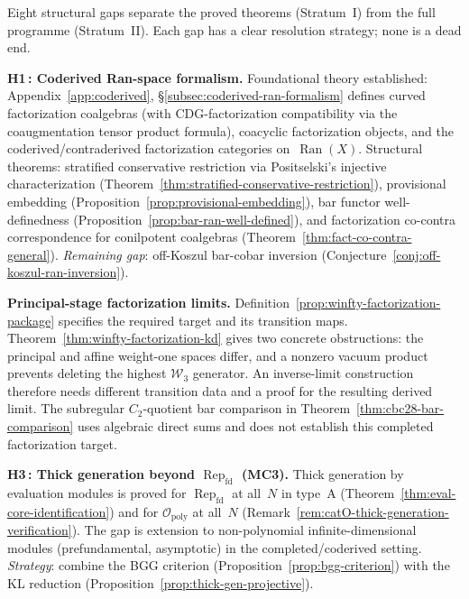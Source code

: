 \begin{remark}\label{rem:structural-gaps}
Eight structural gaps separate the proved theorems
(Stratum~I) from the full programme (Stratum~II).
Each gap has a clear resolution strategy; none is a dead end.

\smallskip\noindent
\textbf{H1\,: Coderived Ran-space formalism.}
Foundational theory established:
Appendix~\ref{app:coderived},
\S\ref{subsec:coderived-ran-formalism} defines curved
factorization coalgebras (with CDG-factorization compatibility
via the coaugmentation tensor product formula), coacyclic
factorization objects, and the coderived/contraderived
factorization categories on~$\operatorname{Ran}(X)$.  Structural
theorems: stratified conservative restriction via Positselski's
injective characterization
(Theorem~\ref{thm:stratified-conservative-restriction}),
provisional embedding
(Proposition~\ref{prop:provisional-embedding}), bar functor
well-definedness
(Proposition~\ref{prop:bar-ran-well-defined}), and factorization
co-contra correspondence for conilpotent coalgebras
(Theorem~\ref{thm:fact-co-contra-general}).
\emph{Remaining gap}: off-Koszul bar-cobar inversion
(Conjecture~\ref{conj:off-koszul-ran-inversion}).

\smallskip\noindent
\textbf{Principal-stage factorization limits.}
Definition~\ref{prop:winfty-factorization-package} specifies the required target and its transition maps.
Theorem~\ref{thm:winfty-factorization-kd} gives two concrete obstructions: the principal and affine weight-one spaces differ, and a nonzero vacuum product prevents deleting the highest $\mathcal W_3$ generator.
An inverse-limit construction therefore needs different transition data and a proof for the resulting derived limit.
The subregular $C_2$-quotient bar comparison in Theorem~\ref{thm:cbc28-bar-comparison} uses algebraic direct sums and does not establish this completed factorization target.

\smallskip\noindent
\textbf{H3\,: Thick generation beyond $\operatorname{Rep}_{\mathrm{fd}}$ (MC3).}
Thick generation by evaluation modules is proved for
$\operatorname{Rep}_{\mathrm{fd}}$
at all~$N$ in type~A
(Theorem~\ref{thm:eval-core-identification}) and for
$\mathcal{O}_{\mathrm{poly}}$ at all~$N$
(Remark~\ref{rem:catO-thick-generation-verification}).
The gap is extension to non-polynomial infinite-dimensional modules
(prefundamental, asymptotic) in the completed/coderived setting.
\emph{Strategy}: combine the BGG criterion
(Proposition~\ref{prop:bgg-criterion}) with the KL reduction
(Proposition~\ref{prop:thick-gen-projective}).


\end{remark}
